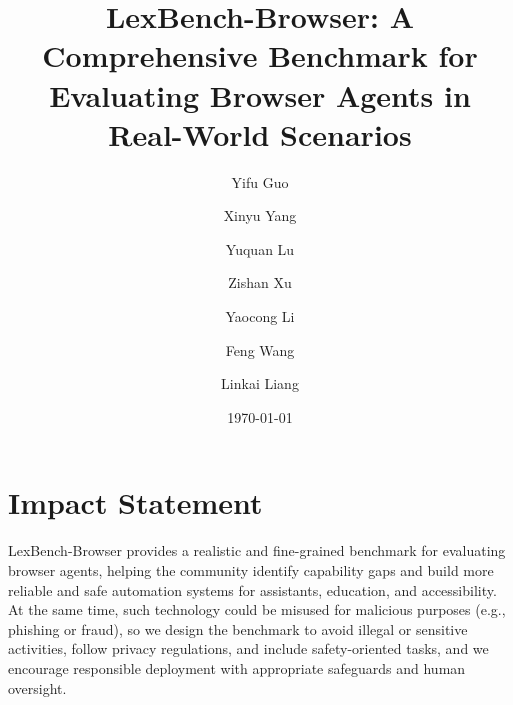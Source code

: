 \documentclass{lexmount}
\title{LexBench-Browser: A Comprehensive Benchmark for Evaluating Browser Agents in Real-World Scenarios}
\author{Yifu Guo}
\author{Xinyu Yang}
\author{Yuquan Lu}
\author{Zishan Xu}
\author{Yaocong Li}
\author[*]{Feng Wang}
\author[*]{Linkai Liang}
\affiliation{Lexmount}
\date{\today}
\theoremstyle{plain}
\theoremstyle{definition}
\theoremstyle{remark}
\begin{document}
\thispagestyle{firstheader}
\maketitle











\section*{Impact Statement}
LexBench-Browser provides a realistic and fine-grained benchmark for evaluating browser agents, helping the community identify capability gaps and build more reliable and safe automation systems for assistants, education, and accessibility. At the same time, such technology could be misused for malicious purposes (e.g., phishing or fraud), so we design the benchmark to avoid illegal or sensitive activities, follow privacy regulations, and include safety-oriented tasks, and we encourage responsible deployment with appropriate safeguards and human oversight.







\end{document}
